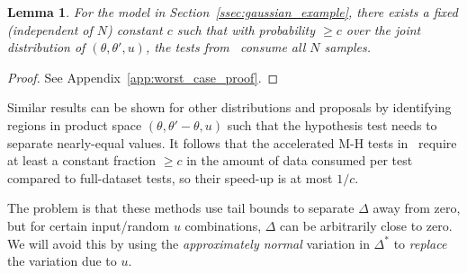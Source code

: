 \documentclass{article}
\newtheorem{lemma}{Lemma}
\begin{document}
\begin{lemma}\label{lem:worst_case}
    For the model in Section~\ref{ssec:gaussian_example}, there exists a fixed
    (independent of $N$) constant $c$ such that with probability $\geq c$ over
    the joint distribution of $(\theta, \theta', u)$, the tests
    from~\cite{cutting_mh_2014,icml2014c1_bardenet14} consume all $N$ samples. 
\end{lemma}

\begin{proof}
See Appendix~\ref{app:worst_case_proof}.
\end{proof}

Similar results can be shown for other distributions and proposals by
identifying regions in product space $(\theta,\theta'-\theta,u)$ such that the
hypothesis test needs to separate nearly-equal values.  It follows that the
accelerated M-H tests in~\cite{cutting_mh_2014,icml2014c1_bardenet14} require at
least a constant fraction $\geq c$ in the amount of data consumed per test
compared to full-dataset tests, so their speed-up is at most $1/c$.


The problem is that these methods use tail bounds to separate $\Delta$ away
from zero, but for certain input/random $u$ combinations, $\Delta$ can be
arbitrarily close to zero. We will avoid this by using the {\em approximately
normal} variation in $\Delta^*$ to {\em replace} the variation due to $u$. 
\end{document}
